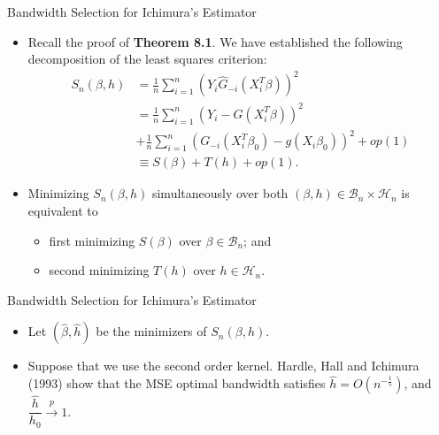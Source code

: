 \documentclass[xcolor=svgnames,dvipdfmx,cjk]{beamer}
\theoremstyle{example}
\def\parrow{\xrightarrow{p}}
\begin{document}
\begin{frame}{Bandwidth Selection for Ichimura's Estimator}
\begin{itemize}
  \item Recall the proof of \textbf{Theorem 8.1}. 
        We have established the following decomposition of the least squares criterion:
        \begin{align*}
          S_n(\beta, h) 
                     &= \frac{1}{n} \sum_{i=1}^{n}(Y_i \hat{G}_{-i}(X_i^T\beta))^2 \\
                     &= \frac{1}{n} \sum_{i=1}^{n}(Y_i-G(X_i^T\beta))^2 \\
                     &+ \frac{1}{n} \sum_{i=1}^{n}({G}_{-i}(X_i^T\beta_0)-g(X_i\beta_0))^2 + op(1) \\
                     &\equiv S(\beta) + T(h) + op(1).
        \end{align*}
  \item Minimizing $S_n(\beta, h)$ simultaneously over both 
        $(\beta, h) \in \mathcal{B}_n \times \mathcal{H}_n$ is equivalent to 
        \begin{itemize}
          \item first minimizing $S(\beta)$ over $\beta \in \mathcal{B}_n$; and
          \item second minimizing $T(h)$ over $h \in \mathcal{H}_n$. 
        \end{itemize}
\end{itemize}
\end{frame}
  
\begin{frame}{Bandwidth Selection for Ichimura's Estimator}
\begin{itemize}
  \item Let $(\hat{\beta},\hat{h})$ be the minimizers of $S_n(\beta, h)$.
  \item Suppose that we use the second order kernel. 
        Hardle, Hall and Ichimura (1993) show that the MSE optimal bandwidth satisfies $\hat{h} = O(n^{-\frac{1}{5}})$, and $\dfrac{\hat{h}}{h_0} \parrow 1$.
\end{itemize}  
\end{frame}
\end{document}
